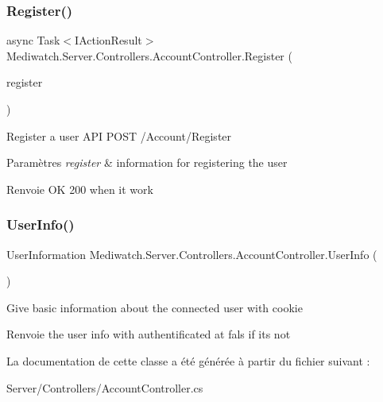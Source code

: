 \subsubsection{\texorpdfstring{Register()}{Register()}}
{\footnotesize\ttfamily async Task$<$I\+Action\+Result$>$ Mediwatch.\+Server.\+Controllers.\+Account\+Controller.\+Register (\begin{DoxyParamCaption}\item[{Register\+Form}]{register }\end{DoxyParamCaption})\hspace{0.3cm}{\ttfamily [inline]}}



Register a user A\+PI P\+O\+ST /\+Account/\+Register 


\begin{DoxyParams}{Paramètres}
{\em register} & information for registering the user\\
\hline
\end{DoxyParams}
\begin{DoxyReturn}{Renvoie}
OK 200 when it work
\end{DoxyReturn}
\mbox{\label{class_mediwatch_1_1_server_1_1_controllers_1_1_account_controller_a35118ac6cb00d088863119bf4cbdc30f}} 
\subsubsection{\texorpdfstring{User\+Info()}{UserInfo()}}
{\footnotesize\ttfamily User\+Information Mediwatch.\+Server.\+Controllers.\+Account\+Controller.\+User\+Info (\begin{DoxyParamCaption}{ }\end{DoxyParamCaption})\hspace{0.3cm}{\ttfamily [inline]}}



Give basic information about the connected user with cookie 

\begin{DoxyReturn}{Renvoie}
the user info with authentificated at fals if it\textquotesingle{}s not
\end{DoxyReturn}


La documentation de cette classe a été générée à partir du fichier suivant \+:\begin{DoxyCompactItemize}
\item 
Server/\+Controllers/Account\+Controller.\+cs\end{DoxyCompactItemize}
